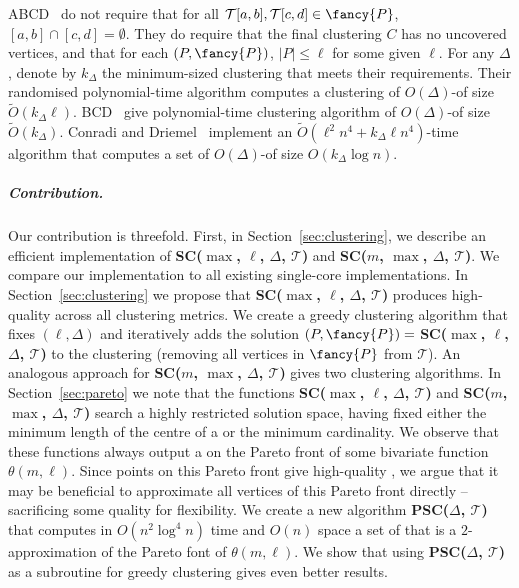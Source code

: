 %
ABCD~\cite{bruning_subtrajectory_2023} do not require that for all $\mathcal{T}[a, b], \mathcal{T}[c, d] \in {\fancy{P}}$, $[a, b] \cap [c, d] = \emptyset$. They do require that the final clustering $C$ has no uncovered vertices, and that for each \pathlet $(P, {\fancy{P}})$, $|P| \leq \ell$ for some given $\ell$. For any $\Delta$, denote by $k_\Delta$ the minimum-sized clustering that meets their requirements. Their randomised polynomial-time algorithm computes  a clustering of $O(\Delta)$-\pathlets of size $\tilde{O}(k_\Delta \ell)$.
BCD~\cite{bruning2022faster} give polynomial-time clustering algorithm of $O(\Delta)$-\pathlets of size $\tilde{O}(k_\Delta)$.  
Conradi and Driemel~\cite{conradi2023finding} implement an $\tilde{O}(\ell^2 n^4 + k_\Delta \ell n^4)$-time algorithm that computes a set of $O(\Delta)$-\pathlets of size $O(k_\Delta \log n)$. 
%
\subparagraph{Contribution.} Our contribution is threefold.
First, in Section~\ref{sec:clustering}, we describe an efficient implementation of \textbf{SC($\max$, $\ell$, $\Delta$, $\mathcal{T}$)} and \textbf{SC($m$, $\max$, $\Delta$, $\mathcal{T}$)}.
We compare our implementation to all existing single-core implementations. 
%
In Section~\ref{sec:clustering} we propose that \textbf{SC($\max$, $\ell$, $\Delta$, $\mathcal{T}$)} produces high-quality \pathlets across all clustering metrics. 
We create a greedy clustering algorithm that fixes $(\ell, \Delta)$ and iteratively adds the solution $(P, {\fancy{P}}) =$ \textbf{SC($\max$, $\ell$, $\Delta$, $\mathcal{T}$)} to the clustering (removing all vertices in ${\fancy{P}}$ from $\mathcal{T}$). An analogous approach for \textbf{SC($m$, $\max$, $\Delta$, $\mathcal{T}$)} gives two clustering algorithms. 
%
In Section~\ref{sec:pareto} we note that the functions \textbf{SC($\max$, $\ell$, $\Delta$, $\mathcal{T}$)} and \textbf{SC($m$, $\max$, $\Delta$, $\mathcal{T}$)} search a highly restricted solution space, having fixed either the minimum length of the centre of a \pathlet or the minimum cardinality. 
We observe that these functions always output a \pathlet on the Pareto front of some bivariate function $\theta(m, \ell)$. 
Since points on this Pareto front give high-quality \pathlets, we argue that it may be beneficial to approximate all vertices of this Pareto front directly -- sacrificing some \pathlet quality for \pathlet flexibility. 
We create a new algorithm \textbf{PSC($\Delta$, $\mathcal{T}$)} that computes in $O( n^2 \log^4 n)$ time and $O(n)$ space a set of \pathlets that is a $2$-approximation of the Pareto font of $\theta(m, \ell)$. 
We show that using \textbf{PSC($\Delta$, $\mathcal{T}$)}  as a  subroutine for greedy clustering gives even better results. 
